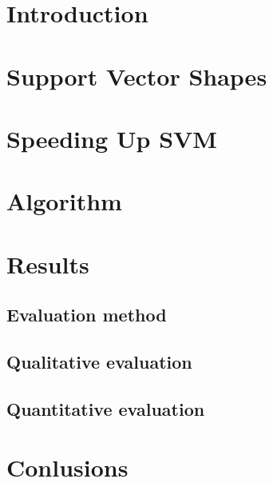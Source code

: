 \documentclass[12pt]{article}
\begin{document}
\maketitle

\section{Introduction}


\section{Support Vector Shapes}



\section{Speeding Up SVM}


\section{Algorithm}


\section{Results}
\subsection{Evaluation method}

\subsection{Qualitative evaluation}

\subsection{Quantitative evaluation}


\section{Conlusions}




\end{document}
